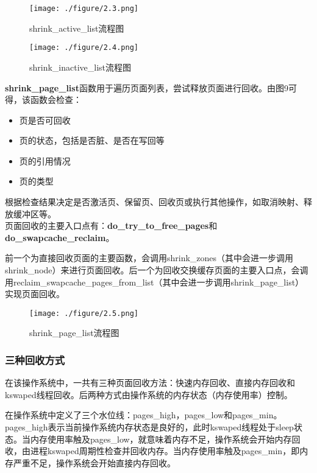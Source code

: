 \documentclass[11pt, a4paper, oneside,UTF8]{ctexart}
\begin{document}
\begin{figure}[ht]
  \centering
  \texttt{[image: ./figure/2.3.png]}
  \caption{shrink\_active\_list流程图}
  \label{figure:2.3}
\end{figure}


\begin{figure}[ht]
  \centering
  \texttt{[image: ./figure/2.4.png]}
  \caption{shrink\_inactive\_list流程图}
  \label{figure:2.4}
\end{figure}

\textbf{shrink\_page\_list}函数用于遍历页面列表，尝试释放页面进行回收。由图9可得，该函数会检查：

\begin{itemize}
  \setlength{\itemsep}{-0.5em}
  \item 页是否可回收
  \item 页的状态，包括是否脏、是否在写回等
  \item 页的引用情况
  \item 页的类型
\end{itemize}
根据检查结果决定是否激活页、保留页、回收页或执行其他操作，如取消映射、释放缓冲区等。\\


页面回收的主要入口点有：\textbf{do\_try\_to\_free\_pages}和\textbf{do\_swapcache\_reclaim}。

前一个为直接回收页面的主要函数，会调用shrink\_zones（其中会进一步调用shrink\_node）来进行页面回收。后一个为回收交换缓存页面的主要入口点，会调用reclaim\_swapcache\_pages\_from\_list（其中会进一步调用shrink\_page\_list）实现页面回收。

\begin{figure}[ht]
  \centering
  \texttt{[image: ./figure/2.5.png]}
  \caption{shrink\_page\_list流程图}
  \label{figure:2.5}
\end{figure}

\subsubsection{三种回收方式}

在该操作系统中，一共有三种页面回收方法：快速内存回收、直接内存回收和kswaped线程回收。后两种方式由操作系统的内存状态（内存使用率）控制。

在操作系统中定义了三个水位线：pages\_high，pages\_low和pages\_min。pages\_high表示当前操作系统内存状态是良好的，此时kswaped线程处于sleep状态。当内存使用率触及pages\_low，就意味着内存不足，操作系统会开始内存回收，由进程kswaped周期性检查并回收内存。当内存使用率触及pages\_min，即内存严重不足，操作系统会开始直接内存回收。
\end{document}
